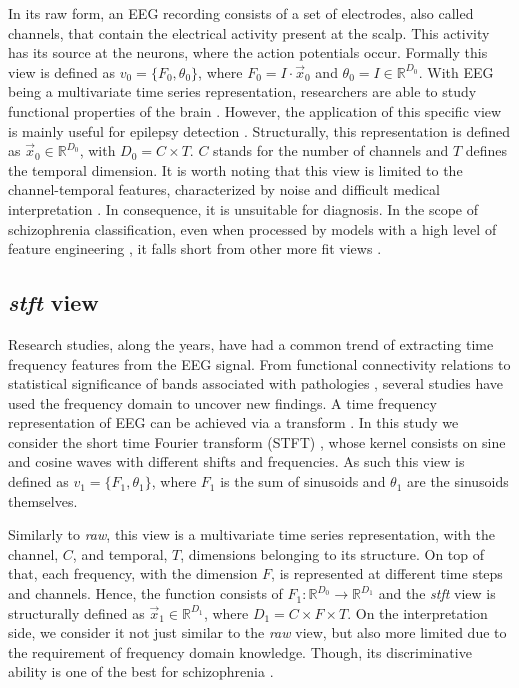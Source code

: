 \documentclass{article}
\begin{document}
In its raw form, an EEG recording consists of a set of electrodes, also called channels, that contain the electrical activity present at the scalp. This activity has its source at the neurons, where the action potentials occur. Formally this view is defined as $v_0 = \{F_0, \theta_0\}$, where $F_0 = I \cdot \vec{x}_0$ and $\theta_0 = I \in \mathbb{R}^{D_0}$. With EEG being a multivariate time series representation, researchers are able to study functional properties of the brain \cite{huang2020temporal}. However, the application of this specific view is mainly useful for epilepsy detection \cite{tatum2021handbook}. Structurally, this representation is defined as $\vec{x}_0 \in \mathbb{R}^{D_0}$, with $D_0 = C \times T$. $C$ stands for the number of channels and $T$ defines the temporal dimension. It is worth noting that this view is limited to the channel-temporal features, characterized by noise and difficult medical interpretation \cite{de2019introduction}. In consequence, it is unsuitable for diagnosis. In the scope of schizophrenia classification, even when processed by models with a high level of feature engineering \cite{oh2019deep}, it falls short from other more fit views \cite{barros2021advanced}.

\subsection{\textit{stft} view}\label{eeg_views:channel_freq_time}

Research studies, along the years, have had a common trend of extracting time frequency features from the EEG signal. From functional connectivity relations \cite{fingelkurts2007impaired,burgess2002functional,albrecht2018time} to statistical significance of bands associated with pathologies \cite{roach2008event,bates2009low}, several studies have used the frequency domain to uncover new findings. A time frequency representation of EEG can be achieved via a transform \cite{bracewell1986fourier}. In this study we consider the short time Fourier transform (STFT) \cite{jacobsen2003sliding}, whose kernel consists on sine and cosine waves with different shifts and frequencies. As such this view is defined as $v_1=\{F_1, \theta_1\}$, where $F_1$ is the sum of sinusoids and $\theta_1$ are the sinusoids themselves.

Similarly to \textit{raw}, this view is a multivariate time series representation, with the channel, $C$, and temporal, $T$, dimensions belonging to its structure. On top of that, each frequency, with the dimension $F$, is represented at different time steps and channels. Hence, the function consists of $F_1: \mathbb{R}^{D_0} \to \mathbb{R}^{D_1}$ and the \textit{stft} view is structurally defined as $\vec{x}_1 \in \mathbb{R}^{D_1}$, where $D_1 = C \times F \times T$. On the interpretation side, we consider it not just similar to the \textit{raw} view, but also more limited due to the requirement of frequency domain knowledge. Though, its discriminative ability is one of the best for schizophrenia \cite{barros2021advanced}.
\end{document}
